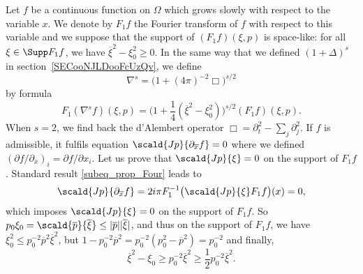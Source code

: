 Let $f$ be a continuous function on $\Omega$ which grows slowly with respect to the variable $x$. We denote by $F_1f$ the Fourier transform of $f$ with respect to this variable and we suppose that the support of $(F_1f)(\xi,p)$ is space-like: for all $\xi\in\Supp F_1f$, we have $\overline{ \xi }^2-\xi_0^2\geq0$. In the same way that we defined $(1+\Delta)^s$ in section~\ref{SECooNJLDooFcUzQv}, we define
\[
	\nabla^s=\big( 1+(4\pi)^{-2}\Box \big)^{s/2}
\]
by formula
\begin{equation}
	F_1(\nabla^sf)(\xi,p)=\big( 1+\frac{ 1 }{ 4 }(\overline{ \xi }^2-\xi_0^2) \big)^{s/2}(F_1f)(\xi,p).
\end{equation}
When $s=2$, we find back the d'Alembert operator $\Box=\partial_t^2-\sum_j\partial_j^2$. If $f$ is admissible, it fulfils equation $\scald{ Jp }{ \partial_{\overline{x}}f }=0$ where we defined $(\partial f/\partial_{\overline{x}})_i=\partial f/\partial x_i$. Let us prove that $\scald{ Jp }{ \xi }=0$ on the support of $F_1f$.	Standard result \eqref{subeq_prop_Four} leads to
\[
	\scald{ Jp }{ \partial_{\overline{x}}f }=2i\pi F_1^{-1}\big( \scald{ Jp }{ \xi }F_1f \big)(x)=0,
\]
which imposes $\scald{ Jp }{ \xi }=0$ on the support of $F_1f$. So $p_0\xi_0=\scald{ \overline{p} }{ \overline{\xi}}\leq| \overline{p} | |\overline{\xi} |$, and thus on the support of $F_1f$, we have $\xi_0^2\leq p_0^{-2}\overline{p}^2\overline{\xi}^2$, but $1-p_0^{-2}\overline{p}^2=p_0^{-2}(p_0^2-\overline{p}^2)=p_0^{-2}$ and finally,
\[
	\overline{\xi}^2-\xi_0\geq p_0^{-2}\overline{\xi}^2\geq\frac{ 1 }{2}p_0^{-2}\overline{\xi}^2.
\]
